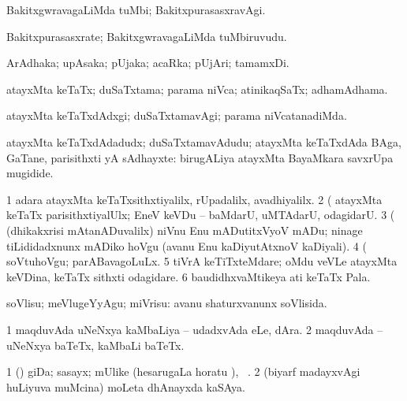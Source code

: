 \begin{center}
\bentry
{} 
\gl{\kirxvi}
\expl{}
\bmng
BakitxgwravagaLiMda tuMbi; BakitxpurasasxravAgi. 
\emng
\eentry

\bentry
{} 
\gl{\nA}
\expl{}
\bmng
Bakitxpurasasxrate; BakitxgwravagaLiMda tuMbiruvudu. 
\emng
\eentry

\bentry
{} 
\gl{\nA}
\expl{}
\bmng
ArAdhaka; upAsaka; pUjaka; acaRka; pUjAri; tamamxDi. 
\emng
\eentry

\bentry 
{} 
\gl{\gu}
\expl{}
\bmng
atayxMta keTaTx; duSaTxtama; parama niVca; atinikaqSaTx; adhamAdhama. 
\emng
\eentry

\bentry 
{} 
\gl{\kirxvi}
\expl{}
\bmng
atayxMta keTaTxdAdxgi; duSaTxtamavAgi; parama niVcatanadiMda. 
\emng
\eentry

\bentry 
{} 
\gl{\nA}
\expl{}
\bmng
atayxMta keTaTxdAdadudx; duSaTxtamavAdudu; atayxMta keTaTxdAda BAga, GaTane, parisithxti yA sAdhayxte:  birugALiya atayxMta BayaMkara savxrUpa mugidide. 
\emng

\noindent
\gl{\pagu}
\expl{}
\bmng
\bnum
\num{1}  adara atayxMta keTaTxsithxtiyalilx, rUpadalilx, avadhiyalilx. 
\num{2}  (  atayxMta keTaTx parisithxtiyalUlx; EneV keVDu -- baMdarU, uMTAdarU, odagidarU. 
\num{3}  (  (dhikakxrisi mAtanADuvalilx) niVnu Enu mADutitxVyoV mADu; ninage tiLididadxnunx mADiko hoVgu (avanu Enu kaDiyutAtxnoV kaDiyali). 
\num{4}  (  soVtuhoVgu; parABavagoLuLx. 
\num{5}  tiVrA keTiTxteMdare; oMdu veVLe atayxMta keVDina, keTaTx sithxti odagidare. 
\num{6}  baudidhxvaMtikeya ati keTaTx Pala. 
\enum
\emng
\eentry

\bentry 
{} 
\gl{\sakirx}
\expl{}
\bmng
soVlisu; meVlugeYyAgu; miVrisu:  avanu shaturxvanunx soVlisida. 
\emng
\eentry

\bentry
{} 
\gl{\nA}
\expl{}
\bmng
\bnum
\num{1} maqduvAda uNeNxya kaMbaLiya -- udadxvAda eLe, dAra. 
\num{2} maqduvAda -- uNeNxya baTeTx, kaMbaLi baTeTx. 
\enum
\emng
\eentry

\bentry
{} 
\gl{\nA}
\expl{}
\bmng
\bnum
\num{1} (\pArxparx) giDa; sasayx; mUlike (hesarugaLa horatu \viparx), \udA\ . 
\num{2} (biyarf madayxvAgi huLiyuva muMcina) moLeta dhAnayxda kaSAya. 
\enum
\emng
\eentry


\end{center}
